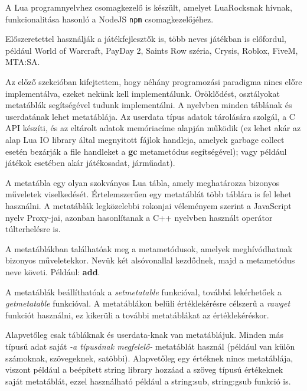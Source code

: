 A Lua programnyelvhez csomagkezelő is készült, amelyet LuaRocksnak hívnak, funkcionalitása hasonló a NodeJS \texttt{npm} csomagkezelőjéhez.

Előszeretettel használják a játékfejlesztők is, több neves játékban is előfordul, például World of Warcraft, PayDay 2, Saints Row széria, Crysis, Roblox, FiveM, MTA:SA. \cite{usageoflua}

\pagebreak

\label{sect:metatables}
Az előző szekcióban kifejtettem, hogy néhány programozási paradigma nincs előre implementálva, ezeket nekünk kell implementálunk. Öröklődést, osztályokat metatáblák segítségével tudunk implementálni.
A nyelvben minden táblának és userdatának lehet metatáblája. Az userdata típus adatok tárolására szolgál, a C API készíti, és az eltárolt adatok memóriacíme alapján működik (ez lehet akár az alap Lua IO library által megnyitott fájlok handleja, amelyek garbage collect esetén bezárják a file handleket a \detokenize{__}\textbf{gc} metametódus segítségével); vagy például játékok esetében akár játékosadat, járműadat).

A metatábla egy olyan szokványos Lua tábla, amely meghatározza bizonyos műveletek viselkedését. Értelemszerűen egy metatáblát több táblára is fel lehet használni. A metatáblák legközelebbi rokonjai véleményem szerint a JavaScript nyelv Proxy-jai, azonban hasonlítanak a C++ nyelvben használt operátor túlterhelésre is. 

A metatáblákban találhatóak meg a metametódusok, amelyek meghívódhatnak bizonyos műveletekkor. Nevük két alsóvonallal kezdődnek, majd a metametódus neve követi. Például: \detokenize{__}\textbf{add}.

A metatáblák beállíthatóak a \textit{setmetatable} funkcióval, továbbá lekérhetőek a \textit{getmetatable} funkcióval. A metatáblákon belüli értéklekérésre célszerű a \textit{rawget} funkciót használni, ez kikerüli a további metatáblákat az értéklekéréskor.

Alapvetőleg csak tábláknak és userdata-knak van metatáblájuk. Minden más típusú adat saját \textit{-a típusának megfelelő-} metatáblát használ (például van külön számoknak, szövegeknek, satöbbi). Alapvetőleg egy értéknek nincs metatáblája, viszont például a beépített string library hozzáad a szöveg típusú értékeknek saját metatáblát, ezzel használható például a string:sub, string:gsub funkció is.

